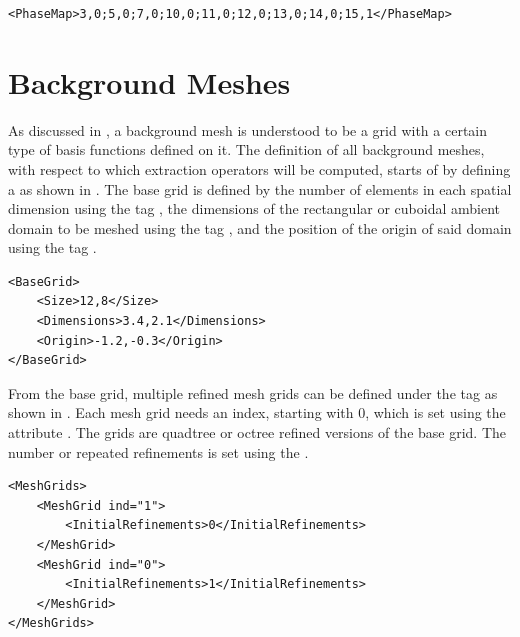 \begin{minipage}{\linewidth}
\vspace{0.5cm}
\begin{lstlisting}[caption={Phase map for the material re-assignment shown in \Cref{fig:phase_assignment}},captionpos=b, label={lst:phase_map}]
<PhaseMap>3,0;5,0;7,0;10,0;11,0;12,0;13,0;14,0;15,1</PhaseMap>
\end{lstlisting}
\end{minipage}
    

\section{Background Meshes}
\label{sec:tutorial_background}

As discussed in , a background mesh is understood to be a grid with a certain type of basis functions defined on it. The definition of all background meshes, with respect to which extraction operators will be computed, starts of by defining a  as shown in . The base grid is defined by the number of elements in each spatial dimension using the tag , the dimensions of the rectangular or cuboidal ambient domain to be meshed using the tag , and the position of the origin of said domain using the tag .

\begin{minipage}{\linewidth}
\vspace{0.5cm}
\begin{lstlisting}[caption={Definition of a base grid},captionpos=b, label={lst:base_grid}]
<BaseGrid>
    <Size>12,8</Size>
    <Dimensions>3.4,2.1</Dimensions>
    <Origin>-1.2,-0.3</Origin>
</BaseGrid>
\end{lstlisting}
\end{minipage}

From the base grid, multiple refined mesh grids can be defined under the tag  as shown in . Each mesh grid needs an index, starting with $0$, which is set using the attribute . The grids are quadtree or octree refined versions of the base grid. The number or repeated refinements is set using the .

\begin{minipage}{\linewidth}
\vspace{0.5cm}
\begin{lstlisting}[caption={Definition of a multiple mesh grids},captionpos=b, label={lst:mesh_grids}]
<MeshGrids>
    <MeshGrid ind="1">
        <InitialRefinements>0</InitialRefinements>
    </MeshGrid>
    <MeshGrid ind="0">
        <InitialRefinements>1</InitialRefinements>
    </MeshGrid>
</MeshGrids>
\end{lstlisting}
\end{minipage}

